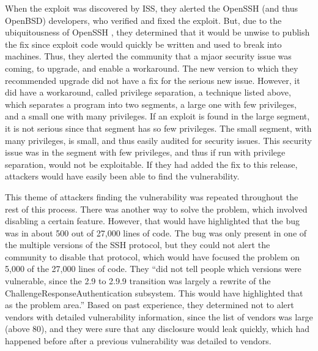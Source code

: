 \documentclass[12pt]{article}
\begin{document}
{When the exploit was discovered by ISS, they alerted the OpenSSH (and thus OpenBSD) developers, who verified and fixed the exploit. But, due to the ubiquitousness of OpenSSH \cite{openssh-usage}, they determined that it would be unwise to publish the fix since exploit code would quickly be written and used to break into machines. Thus, they alerted the community that a mjaor security issue was coming, to upgrade, and enable a workaround. The new version to which they recommended upgrade did not have a fix for the serious new issue. However, it did have a workaround, called privilege separation, a technique listed above, which separates a program into two segments, a large one with few privileges, and a small one with many privileges. If an exploit is found in the large segment, it is not serious since that segment has so few privileges. The small segment, with many privileges, is small, and thus easily audited for security issues. This security issue was in the segment with few privileges, and thus if run with privilege separation, would not be exploitable. If they had added the fix to this release, attackers would have easily been able to find the vulnerability. \cite{openssh-advisory}

This theme of attackers finding the vulnerability was repeated throughout the rest of this process. There was another way to solve the problem, which involved disabling a certain feature. However, that would have highlighted that the bug was in about 500 out of 27,000 lines of code. The bug was only present in one of the multiple versions of the SSH protocol, but they could not alert the community to disable that protocol, which would have focused the problem on 5,000 of the 27,000 lines of code. They ``did not tell people which versions were vulnerable, since the 2.9 to 2.9.9 transition was largely a rewrite of the ChallengeResponseAuthentication subsystem. This would have highlighted that as the problem area.'' Based on past experience, they determined not to alert vendors with detailed vulnerability information, since the list of vendors was large (above 80), and they were sure that any disclosure would leak quickly, which had happened before after a previous vulnerability was detailed to vendors. \cite{openssh-advisory}

}
\end{document}
